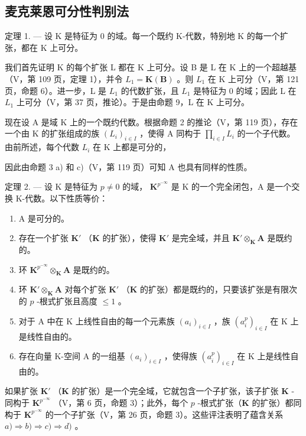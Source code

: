 \subsection{麦克莱恩可分性判别法}

定理 1. --- 设 K 是特征为 0 的域。每一个既约 K-代数，特别地 K 的每一个扩张，都在 K 上可分。

我们首先证明 K 的每个扩张 L 都在 K 上可分。设 B 是 L 在 K 上的一个超越基（V，第 109 页，定理 1），并令 \(L_{1} = \mathbf{K}(\mathbf{B})\) 。则 \(L_{1}\) 在 K 上可分（V，第 121 页，命题 6）。进一步，L 是 \(L_{1}\) 的代数扩张，且 \(L_{1}\) 是特征为 0 的域；因此 L 在 \(L_{1}\) 上可分（V，第 37 页，推论）。于是由命题 9，L 在 K 上可分。

现在设 A 是域 K 上的一个既约代数。根据命题 2 的推论（V，第 119 页），存在一个由 K 的扩张组成的族 \((L_{i})_{i \in I}\) ，使得 A 同构于 \(\prod_{i \in I} L_{i}\) 的一个子代数。由前所述，每个代数 \(L_{i}\) 在 K 上都是可分的，

因此由命题 3 a) 和 c)（V，第 119 页）可知 A 也具有同样的性质。

定理 2. --- 设 K 是特征为 \(p \neq 0\) 的域， \(\mathbf{K}^{p^{-\infty}}\) 是 K 的一个完全闭包，A 是一个交换 K-代数。以下性质等价：

\begin{enumerate}
\def\labelenumi{\alph{enumi})}
\item
  A 是可分的。
\item
  存在一个扩张 \(\mathbf{K}'\) （\(\mathbf{K}\) 的扩张），使得 \(\mathbf{K}'\) 是完全域，并且 \(\mathbf{K}' \otimes_{\mathbf{K}} \mathbf{A}\) 是既约的。
\item
  环 \(\mathbf{K}^{p^{-\infty}}\otimes_{\mathbf{K}}\mathbf{A}\) 是既约的。
\item
  环 \(\mathbf{K}' \otimes_{\mathbf{K}} \mathbf{A}\) 对每个扩张 \(\mathbf{K}'\) （\(\mathbf{K}\) 的扩张）都是既约的，只要该扩张是有限次的 \(p\) -根式扩张且高度 \(\leqslant 1\) 。
\item
  对于 A 中在 K 上线性自由的每一个元素族 \((a_{i})_{i\in I}\) ，族 \((a_{i}^{p})_{i\in I}\) 在 K 上是线性自由的。
\item
  存在向量 K-空间 A 的一组基 \((a_{i})_{i\in I}\) ，使得族 \((a_{i}^{p})_{i\in I}\) 在 K 上是线性自由的。
\end{enumerate}

如果扩张 \(\mathbf{K}'\) （\(\mathbf{K}\) 的扩张）是一个完全域，它就包含一个子扩张，该子扩张 \(\mathbf{K}\) -同构于 \(\mathbf{K}^{p^{-\infty}}\) （V，第 6 页，命题 3）；此外，每个 \(p\) -根式扩张（\(\mathbf{K}\) 的扩张）都同构于 \(\mathbf{K}^{p^{-\infty}}\) 的一个子扩张（V，第 26 页，命题 3）。这些评注表明了蕴含关系 \(a) \Rightarrow b) \Rightarrow c) \Rightarrow d)\) 。

